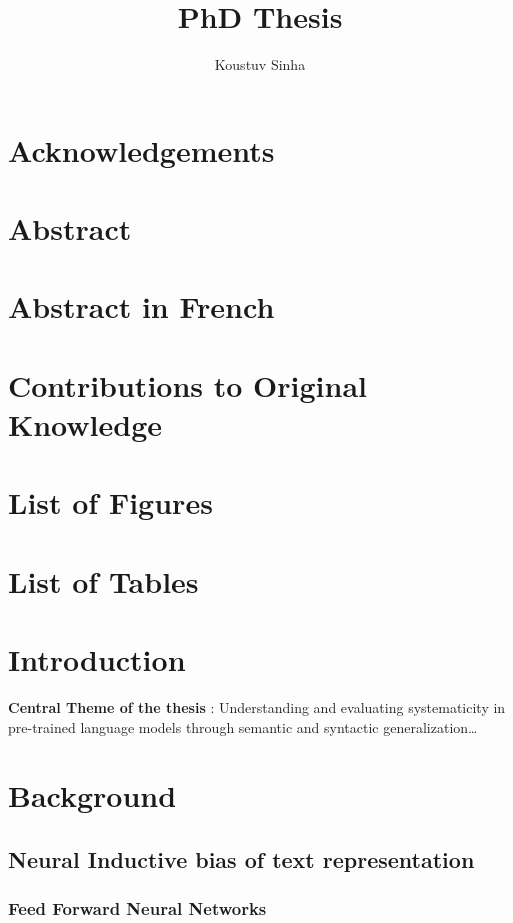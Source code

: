 \documentclass[letterpaper, 11pt]{article}
\author{Koustuv Sinha}
\date{}
\title{PhD Thesis}
\begin{document}
\maketitle

\section*{Acknowledgements}
\label{sec:org5951b21}
\section*{Abstract}
\label{sec:org41606f3}
\section*{Abstract in French}
\label{sec:org596b6fe}
\section*{Contributions to Original Knowledge}
\label{sec:org8ddffa3}
\section*{List of Figures}
\label{sec:orgd8b047f}
\section*{List of Tables}
\label{sec:orgf3f937f}
\clearpage
\setcounter{tocdepth}{2}
\tableofcontents


\clearpage
\section{Introduction}
\label{sec:org52ca774}
\textbf{\textbf{Central Theme of the thesis}} : Understanding and evaluating systematicity in pre-trained language models through semantic and syntactic generalization\ldots{}


\clearpage
\section{Background}
\label{sec:org846b772}

\subsection{Neural Inductive bias of text representation}
\label{sec:org170079f}
\subsubsection{Feed Forward Neural Networks}
\label{sec:org2043ad0}
\end{document}
